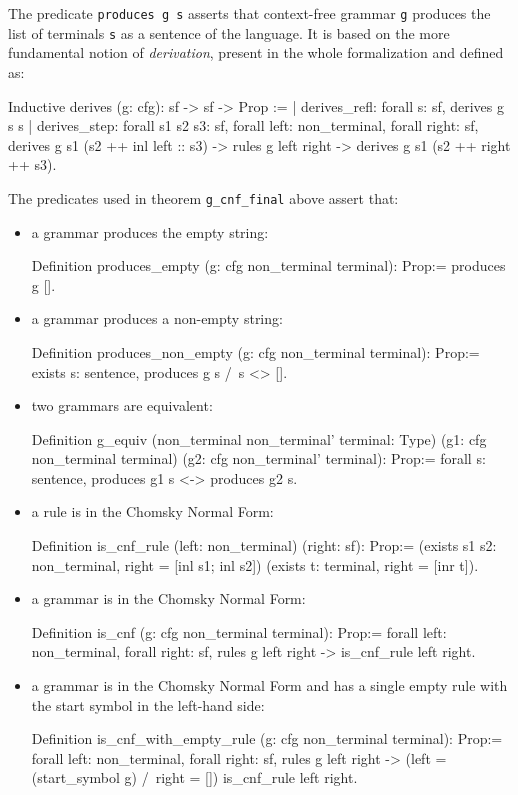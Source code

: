 \documentclass {elsarticle}
\begin{document}
The predicate \texttt {produces g s} asserts that context-free grammar \texttt {g} produces the list of terminals \texttt {s} as a sentence of the language. It is based on the more fundamental notion of \emph {derivation}, present in the whole formalization and defined as:

\begin{coq}
Inductive derives (g: cfg): sf -> sf -> Prop :=
| derives_refl: 
         forall s: sf,
         derives g s s
| derives_step: 
         forall s1 s2 s3: sf,
         forall left: non_terminal,
         forall right: sf,
         derives g s1 (s2 ++ inl left :: s3) ->
         rules g left right ->
         derives g s1 (s2 ++ right ++ s3).
\end{coq}

The predicates used in theorem \texttt {g\_cnf\_final} above assert that:

\begin {itemize}
\item a grammar produces the empty string:
      \begin{coq}
	  Definition produces_empty 
	  (g: cfg non_terminal terminal): Prop:=
	  produces g [].
      \end{coq}
\item a grammar produces a non-empty string:
      \begin{coq}
	  Definition produces_non_empty 
	  (g: cfg non_terminal terminal): Prop:=
	  exists s: sentence, produces g s /\ s <> [].     
	  \end{coq}
\item two grammars are equivalent:
      \begin{coq}
	  Definition g_equiv 
	  (non_terminal non_terminal' terminal: Type) 
	  (g1: cfg non_terminal terminal) 
	  (g2: cfg non_terminal' terminal): Prop:=
      forall s: sentence,
      produces g1 s <-> produces g2 s.
	  \end{coq}
\item a rule is in the Chomsky Normal Form:
      \begin{coq}
	  Definition is_cnf_rule 
	  (left: non_terminal) (right: sf): Prop:=
      (exists s1 s2: non_terminal, right = [inl s1; inl s2]) \/
      (exists t: terminal, right = [inr t]).
	  \end{coq}
\item a grammar is in the Chomsky Normal Form:
      \begin{coq}
	  Definition is_cnf 
	  (g: cfg non_terminal terminal): Prop:=
	  forall left: non_terminal,
	  forall right: sf,
	  rules g left right -> is_cnf_rule left right.
	  \end{coq}
\item a grammar is in the Chomsky Normal Form and has a single empty rule with the start symbol in the left-hand side:
      \begin{coq}
	  Definition is_cnf_with_empty_rule 
	  (g: cfg non_terminal terminal): Prop:=
	  forall left: non_terminal,
	  forall right: sf,
	  rules g left right ->
	  (left = (start_symbol g) /\ right = []) \/
	  is_cnf_rule left right.	  
	  \end{coq}
\end {itemize}
\end{document}
